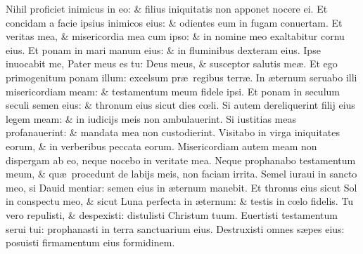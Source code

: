 \documentclass[a5paper,10pt]{book}
\def\ae{æ}
\def\oe{œ}
\begin{document}
\begin{multicols*}{2}
\newline \color{red} N\color{black}ihil proficiet inimicus in eo: \& filius iniquitatis non apponet nocere ei.
\newline \color{red} E\color{black}t concidam a facie ipsius inimicos eius: \& odientes eum in fugam conuertam.
\newline \color{red} E\color{black}t veritas mea, \& misericordia mea cum ipso: \& in nomine meo exaltabitur cornu eius.
\newline \color{red} E\color{black}t ponam in mari manum eius: \& in fluminibus dexteram eius.
\newline \color{red} I\color{black}pse inuocabit me, Pater meus es tu: Deus meus, \& susceptor salutis me\ae .
\newline \color{red} E\color{black}t ego primogenitum ponam illum: excelsum pr\ae \ regibus terr\ae .
\newline \color{red} I\color{black}n \ae ternum seruabo illi misericordiam meam: \& testamentum meum fidele ipsi.
\newline \color{red} E\color{black}t ponam in seculum seculi semen eius: \& thronum eius sicut dies c\oe li.
\newline \color{red} S\color{black}i autem dereliquerint filij eius legem meam: \& in iudicijs meis non ambulauerint.
\newline \color{red} S\color{black}i iustitias meas profanauerint: \& mandata mea non custodierint.
\newline \color{red} V\color{black}isitabo in virga iniquitates eorum, \& in verberibus peccata eorum.
\newline \color{red} M\color{black}isericordiam autem meam non dispergam ab eo, neque nocebo in veritate mea.
\newline \color{red} N\color{black}eque prophanabo testamentum meum, \& qu\ae \ procedunt de labijs meis, non faciam irrita.
\newline \color{red} S\color{black}emel iuraui in sancto meo, si Dauid mentiar: semen eius in \ae ternum manebit.
\newline \color{red} E\color{black}t thronus eius sicut Sol in conspectu meo, \& sicut Luna perfecta in \ae ternum: \& testis in c\oe lo fidelis.
\newline \color{red} T\color{black}u vero repulisti, \& despexisti: distulisti Christum tuum.
\newline \color{red} E\color{black}uertisti testamentum serui tui: prophanasti in terra sanctuarium eius.
\newline \color{red} D\color{black}estruxisti omnes s\ae pes eius: posuisti firmamentum eius formidinem.

\end{multicols*}
\end{document}

